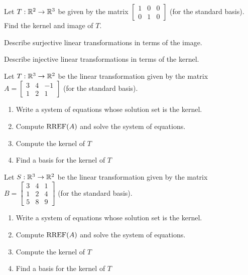 \begin{applicationActivities}{2}{18}
\begin{activity}{0}
Let $T: \mathbb{R}^2 \rightarrow \mathbb{R}^3$ be given by the matrix $\begin{bmatrix} 1 & 0 &0  \\ 0 & 1 & 0 \end{bmatrix}$ (for the standard basis).  Find the kernel and image of $T$.
\end{activity}

\begin{activity}{0}
  \begin{subactivity}
    Describe surjective linear transformations in terms of the image.
  \end{subactivity}
  \begin{subactivity}
    Describe injective linear transformations in terms of the kernel.
  \end{subactivity}
\end{activity}

\begin{activity}{0}
Let $T: \mathbb{R}^3 \rightarrow \mathbb{R}^2$ be the linear transformation given by the matrix $A=\begin{bmatrix} 3 & 4 & -1 \\ 1 & 2 & 1 \end{bmatrix}$ (for the standard basis).
\begin{enumerate}[1)]
\item Write a system of equations whose solution set is the kernel.
\item Compute $\operatorname{RREF}(A)$ and solve the system of equations.
\item Compute the kernel of $T$
\item Find a basis for the kernel of $T$
\end{enumerate}
\end{activity}

\begin{activity}{0}
Let $S: \mathbb{R}^3 \rightarrow \mathbb{R}^2$ be the linear transformation given by the matrix $B=\begin{bmatrix} 3 & 4 & 1 \\ 1 & 2 & 4 \\ 5 & 8 & 9 \end{bmatrix}$ (for the standard basis).
\begin{enumerate}[1)]
\item Write a system of equations whose solution set is the kernel.
\item Compute $\operatorname{RREF}(A)$ and solve the system of equations.
\item Compute the kernel of $T$
\item Find a basis for the kernel of $T$
\end{enumerate}
\end{activity}


\end{applicationActivities}
